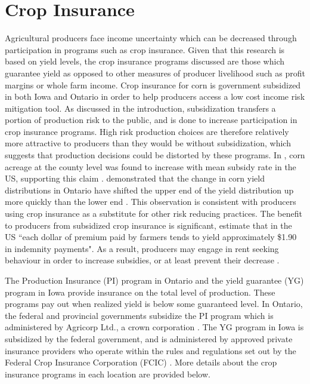 \section{Crop Insurance}

Agricultural producers face income uncertainty which can be decreased through participation in programs such as crop insurance. Given that this research is based on yield levels, the crop insurance programs  discussed are those which guarantee yield as opposed to  other measures of producer livelihood such as profit margins or whole farm income. Crop insurance for corn is government subsidized in both Iowa and Ontario in order to help producers access a low cost income risk mitigation tool. As discussed in the introduction, subsidization transfers  a portion of production risk to the public, and is done to increase participation in crop insurance programs. High risk production choices are therefore relatively more attractive to producers than they would be without subsidization, which suggests that production decisions could be distorted by these programs. In \cite{goodwin2013harm}, corn acreage at the county level was found to increase with mean subsidy rate in the US, supporting this claim \citep{goodwin2013harm}. \cite{kerRMP2016} demonstrated that the change in corn yield distributions in Ontario have shifted the upper end of the yield distribution up more quickly than the lower end \citep{kerRMP2016}. This observation is consistent with producers using crop insurance as a substitute for other risk reducing practices. The benefit to producers from subsidized crop insurance is significant, \cite{goodwin2013harm} estimate that in the US ``each dollar of premium paid by farmers tends to yield approximately \$1.90 in indemnity payments". As a result, producers may engage in rent seeking behaviour in order to increase subsidies, or at least prevent their decrease \citep{coble2013we, kerRMP2016}. 

The Production Insurance (PI) program in Ontario and the yield guarantee (YG) program in Iowa provide insurance on the total level of production. These programs pay out when realized yield is below some guaranteed level. In Ontario, the federal and provincial governments subsidize the PI program which is administered by Agricorp Ltd., a crown corporation \citep{li2014climate}. The YG program in Iowa is  subsidized by the federal government, and is administered by approved private insurance providers who operate within the rules and regulations set out by the Federal Crop Insurance Corporation (FCIC) \citep{NCIS}. More details about the crop insurance programs in each location are provided below.

